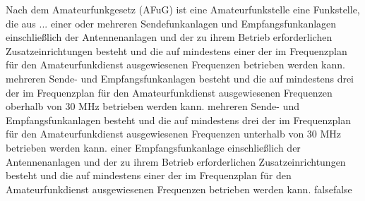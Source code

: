     {Nach dem Amateurfunkgesetz (AFuG) ist eine Amateurfunkstelle eine Funkstelle, die aus ...}
    {einer oder mehreren Sendefunkanlagen und Empfangsfunkanlagen einschließlich der Antennenanlagen und der zu ihrem Betrieb erforderlichen Zusatzeinrichtungen besteht und die auf mindestens einer der im Frequenzplan für den Amateurfunkdienst ausgewiesenen Frequenzen betrieben werden kann.}
    {mehreren Sende- und Empfangsfunkanlagen besteht und die auf mindestens drei der im Frequenzplan für den Amateurfunkdienst ausgewiesenen Frequenzen oberhalb von 30 MHz betrieben werden kann.}
    {mehreren Sende- und Empfangsfunkanlagen besteht und die auf mindestens drei der im Frequenzplan für den Amateurfunkdienst ausgewiesenen Frequenzen unterhalb von 30 MHz betrieben werden kann.}
    {einer Empfangsfunkanlage einschließlich der Antennenanlagen und der zu ihrem Betrieb erforderlichen Zusatzeinrichtungen besteht und die auf mindestens einer der im Frequenzplan für den Amateurfunkdienst ausgewiesenen Frequenzen betrieben werden kann.}
    {false}{false}